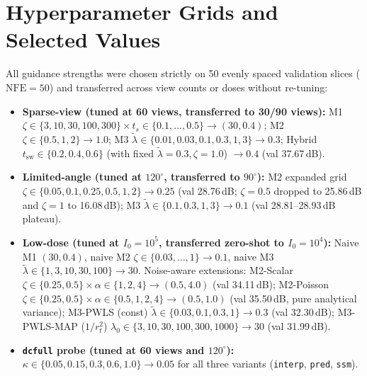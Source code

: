 \documentclass[11pt]{article}
\begin{document}
\section{Hyperparameter Grids and Selected Values}
\label{app:tuning}
All guidance strengths were chosen strictly on 50 evenly spaced validation slices ($\mathrm{NFE}{=}50$) and transferred across view counts or doses without re-tuning:
\begin{itemize}[leftmargin=*,nosep]
  \item \textbf{Sparse-view (tuned at 60 views, transferred to 30/90 views):} M1 $\zeta\in\{3,10,30,100,300\}\times t_s\in\{0.1,\dots,0.5\}\to(30,0.4)$; M2 $\zeta\in\{0.5,1,2\}\to 1.0$; M3 $\tilde\lambda\in\{0.01,0.03,0.1,0.3,1,3\}\to 0.3$; Hybrid $t_{\mathrm{sw}}\in\{0.2,0.4,0.6\}$ (with fixed $\tilde\lambda{=}0.3, \zeta{=}1.0$) $\to 0.4$ (val 37.67\,dB).
  \item \textbf{Limited-angle (tuned at $120^\circ$, transferred to $90^\circ$):} M2 expanded grid $\zeta\in\{0.05,0.1,0.25,0.5,1,2\}\to 0.25$ (val 28.76\,dB; $\zeta{=}0.5$ dropped to 25.86\,dB and $\zeta{=}1$ to 16.08\,dB); M3 $\tilde\lambda\in\{0.1,0.3,1,3\}\to 0.1$ (val 28.81--28.93\,dB plateau).
  \item \textbf{Low-dose (tuned at $I_0{=}10^5$, transferred zero-shot to $I_0{=}10^4$):} Naive M1 $(30,0.4)$, naive M2 $\zeta\in\{0.03,\dots,1\}\to 0.1$, naive M3 $\tilde\lambda\in\{1,3,10,30,100\}\to 30$. Noise-aware extensions: M2-Scalar $\zeta\in\{0.25,0.5\}\times\alpha\in\{1,2,4\}\to(0.5,4.0)$ (val 34.11\,dB); M2-Poisson $\zeta\in\{0.25,0.5\}\times\alpha\in\{0.5,1,2,4\}\to(0.5,1.0)$ (val 35.50\,dB, pure analytical variance); M3-PWLS (const) $\tilde\lambda\in\{0.03,0.1,0.3,1\}\to 0.3$ (val 32.30\,dB); M3-PWLS-MAP ($1/r_t^2$) $\lambda_0\in\{3,10,30,100,300,1000\}\to 30$ (val 31.99\,dB).
  \item \textbf{\texttt{dcfull} probe (tuned at 60 views and $120^\circ$):} $\kappa\in\{0.05,0.15,0.3,0.6,1.0\}\to 0.05$ for all three variants (\texttt{interp}, \texttt{pred}, \texttt{ssm}).
\end{itemize}



\end{document}
